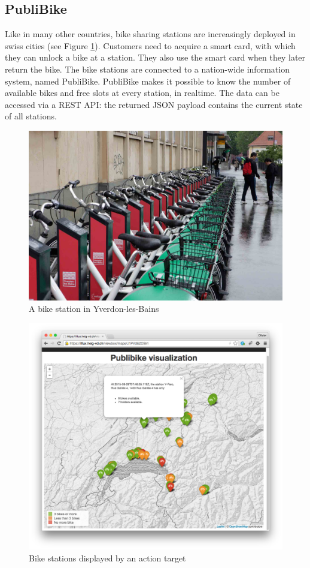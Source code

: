 \subsection{PubliBike}

Like in many other countries, bike sharing stations are increasingly deployed in swiss cities (see Figure \ref{fig:publibikeStation}). Customers need to acquire a smart card, with which they can unlock a bike at a station. They also use the smart card when they later return the bike. The bike stations are connected to a nation-wide information system, named PubliBike. PubliBike makes it possible to know the number of available bikes and free slots at every station, in realtime. The data can be accessed via a REST API: the returned JSON payload contains the current state of all stations.

\begin{figure}[H]
\centering
\includegraphics[width=0.85\columnwidth]{figures/publibikephoto2.jpg}
\caption{A bike station in Yverdon-les-Bains}
\label{fig:publibikeStation}
\end{figure}

\begin{figure}[H]
\centering
\includegraphics[width=0.75\columnwidth]{figures/publibike-viewbox.png}
\caption{Bike stations displayed by an action target}
\label{fig:publibikeMap}
\end{figure}


